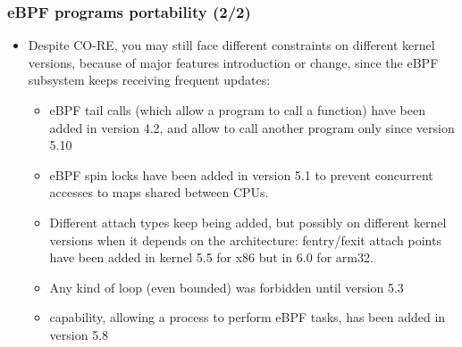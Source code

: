 \begin{frame}
  \frametitle{eBPF programs portability (2/2)}
  \begin{itemize}
    \item Despite CO-RE, you may still face different constraints on different
    kernel versions, because of major features introduction or change, since
    the eBPF subsystem keeps receiving frequent updates:
    \begin{itemize}
      \item eBPF tail calls (which allow a program to call a function) have
      been added in version 4.2, and allow to call another program only since
      version 5.10
      \item eBPF spin locks have been added in version 5.1 to prevent
      concurrent accesses to maps shared between CPUs.
      \item Different attach types keep being added, but possibly on different
      kernel versions when it depends on the architecture: fentry/fexit attach
      points have been added in kernel 5.5 for x86 but in 6.0 for arm32.
      \item Any kind of loop (even bounded) was forbidden until version 5.3
      \item {} capability, allowing a process to perform eBPF tasks, has
      been added in version 5.8
    \end{itemize}
  \end{itemize}
\end{frame}

